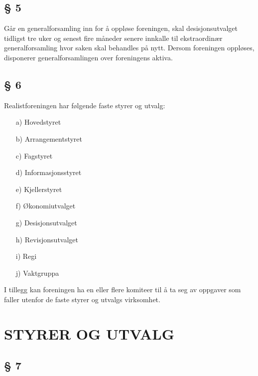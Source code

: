 \subsection*{§ 5}

Går en generalforsamling inn for å oppløse foreningen, skal
desisjonsutvalget tidligst tre uker og senest fire måneder senere
innkalle til ekstraordinær generalforsamling hvor saken skal behandles
på nytt. Dersom foreningen oppløses, disponerer generalforsamlingen
over foreningens aktiva.


\subsection*{§ 6}

Realistforeningen har følgende faste styrer og utvalg: 

\begin{itemize}
\item[a)] Hovedstyret 

\item[b)] Arrangementstyret 

\item[c)] Fagstyret

\item[d)] Informasjonsstyret 

\item[e)] Kjellerstyret

\item[f)] Økonomiutvalget 

\item[g)] Desisjonsutvalget 

\item[h)] Revisjonsutvalget 

\item[i)] Regi 

\item[j)] Vaktgruppa 
\end{itemize}

I tillegg kan foreningen ha en eller flere komiteer til å ta seg av
oppgaver som faller utenfor de faste styrer og utvalgs virksomhet.



\section*{STYRER OG UTVALG}


\subsection*{§ 7}

